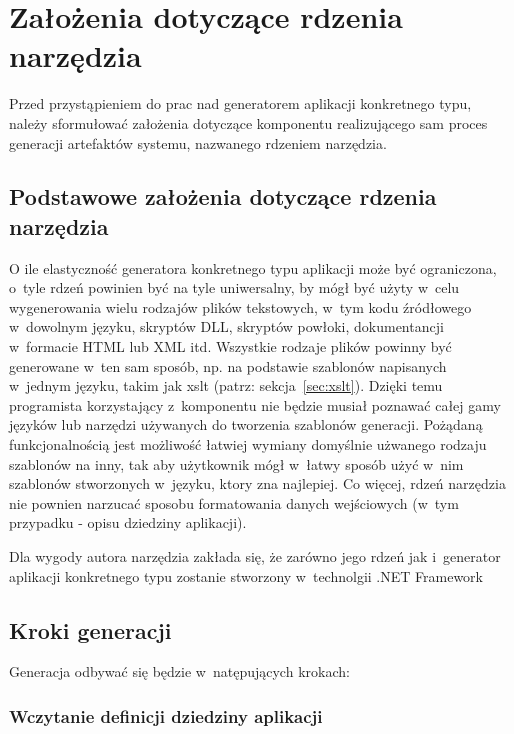 \chapter{Założenia dotyczące rdzenia narzędzia} \label{chap:implementation:core}

Przed przystąpieniem do prac nad generatorem aplikacji konkretnego typu, należy sformułować założenia dotyczące komponentu realizującego sam proces generacji artefaktów systemu, nazwanego rdzeniem narzędzia.



\section{Podstawowe założenia dotyczące rdzenia narzędzia} \label{sec:core:basic_requirements}

O ile elastyczność generatora konkretnego typu aplikacji może być ograniczona, o~tyle rdzeń powinien być na tyle uniwersalny, by mógł być użyty w~celu wygenerowania wielu rodzajów plików tekstowych, w~tym kodu źródłowego w~dowolnym języku, skryptów DLL, skryptów powłoki, dokumentancji w~formacie HTML lub XML itd.
Wszystkie rodzaje plików powinny być generowane w~ten sam sposób, np. na podstawie szablonów napisanych w~jednym języku, takim jak xslt (patrz: sekcja~\ref{sec:xslt}).
Dzięki temu programista korzystający z~komponentu nie będzie musiał poznawać całej gamy języków lub narzędzi używanych do tworzenia szablonów generacji.
Pożądaną funkcjonalnością jest możliwość łatwiej wymiany domyślnie użwanego rodzaju szablonów na inny, tak aby użytkownik mógł w~łatwy sposób użyć w~nim szablonów stworzonych w~języku, ktory zna najlepiej.
Co więcej, rdzeń narzędzia nie pownien narzucać sposobu formatowania danych wejściowych (w~tym przypadku - opisu dziedziny aplikacji).

Dla wygody autora narzędzia zakłada się, że zarówno jego rdzeń jak i~generator aplikacji konkretnego typu zostanie stworzony w~technolgii .NET Framework



\section{Kroki generacji} \label{sec:generation_steps}

Generacja odbywać się będzie w~natępujących krokach:


\subsection{Wczytanie definicji dziedziny aplikacji}

